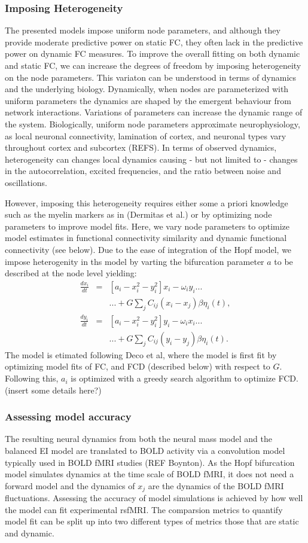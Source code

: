 \documentclass[oneside]{zHenriquesLab-StyleBioRxiv}
\begin{document}
\subsubsection*{Imposing Heterogeneity}
The presented models impose uniform node parameters, and although they provide moderate predictive power on static FC, they often lack in the predictive power on dynamic FC measures. To improve the overall fitting on both dynamic and static FC, we can increase the degrees of freedom by imposing heterogeneity on the node parameters. This variaton can be understood in terms of dynamics and the underlying biology. Dynamically, when nodes are parameterized with uniform parameters the dynamics are shaped by the emergent behaviour from network interactions. Variations of parameters can increase the dynamic range of the system. Biologically, uniform node parameters approximate neurophysiology, as local neuronal connectivity, lamination of cortex, and neuronal types vary throughout cortex and subcortex (REFS). In terms of observed dynamics, heterogeneity can changes local dynamics causing - but not limited to - changes in the autocorrelation, excited frequencies, and the ratio between noise and oscillations. 


However, imposing this heterogeneity requires either some a priori knowledge such as the myelin markers as in (Dermitas et al.) or by optimizing node parameters to improve model fits. Here, we vary node parameters to optimize model estimates in functional connectivity similarity and dynamic functional connectivity (see below). Due to the ease of integration of the Hopf model, we impose heterogenity in ths model by varting the bifurcation parameter $a$ to be described at the node level yielding:
\begin{eqnarray}
\frac{dx_i}{dt} &=& [a_i - x_i^2 - y_i^2]x_i- \omega_iy_i...\\
& &...+ G\sum_jC_{ij}(x_i-x_j)\beta\eta_i(t),\\
\frac{dy_i}{dt} &=& [a_i - x_i^2 - y_i^2]y_i - \omega_ix_i ... \\
& &...+ G\sum_jC_{ij}(y_i-y_j)\beta\eta_i(t).
\end{eqnarray}
The model is etimated following Deco et al, where the model is first fit by optimizing model fits of FC, and FCD (described below) with respect to $G$. Following this, $a_i$ is optimized with a greedy search algorithm to optimize FCD. (insert some details here?)

\subsubsection*{Assessing model accuracy}
The resulting neural dynamics from both the neural mass model and the balanced EI model are translated to BOLD activity via a convolution model typically used in BOLD fMRI studies (REF Boynton). As the Hopf bifurcation model simulates dynamics at the time scale of BOLD fMRI, it does not need a forward model and the dynamics of $x_j$ are the dynamics of the BOLD fMRI fluctuations. Assessing the accuracy of model simulations is achieved by how well the model can fit experimental rsfMRI. The comparsion metrics to quantify model fit can be split up into two different types of metrics those that are static and dynamic. 
\end{document}
